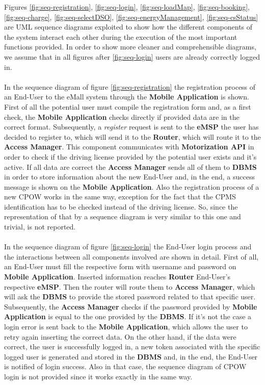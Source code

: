 \documentclass[a4paper]{report}
\begin{document}
Figures \ref{fig:seq-registration}, \ref{fig:seq-login}, \ref{fig:seq-loadMap}, \ref{fig:seq-booking}, \ref{fig:seq-charge}, \ref{fig:seq-selectDSO}, \ref{fig:seq-energyManagement}, \ref{fig:seq-csStatus} are UML sequence diagrams exploited to show how the different components of the system interact each other during the execution of the most important functions provided. In order to show more cleaner and comprehensible diagrams, we assume that in all figures after \ref{fig:seq-login} users are already correctly logged in.
\\\\
In the sequence diagram of figure \ref{fig:seq-registration} the registration process of an End-User to the eMall system through the \textbf{Mobile Application} is shown. First of all the potential user must compile the registration form and, as a first check, the \textbf{Mobile Application} checks directly if provided data are in the correct format. Subsequently, a \textit{register} request is sent to the \textbf{eMSP} the user has decided to register to, which will send it to the \textbf{Router}, which will route it to the \textbf{Access Manager}. This component communicates with \textbf{Motorization API} in order to check if the driving license provided by the potential user exists and it's active. If all data are correct the \textbf{Access Manager} sends all of them to \textbf{DBMS} in order to store information about the new End-User and, in the end, a success message is shown on the \textbf{Mobile Application}. Also the registration process of a new CPOW works in the same way, exception for the fact that the CPMS identification has to be checked instead of the driving license. So, since the representation of that by a sequence diagram is very similar to this one and trivial, is not reported.
\\\\
In the sequence diagram of figure \ref{fig:seq-login} the End-User login process and the interactions between all components involved are shown in detail. First of all, an End-User must fill the respective form with username and password on \textbf{Mobile Application}. Inserted information reaches \textbf{Router} End-User's respective \textbf{eMSP}. Then the router will route them to \textbf{Access Manager}, which will ask the \textbf{DBMS} to provide the stored password related to that specific user. Subsequently, the \textbf{Access Manager} checks if the password provided by \textbf{Mobile Application} is equal to the one provided by the \textbf{DBMS}. If it's not the case a login error is sent back to the \textbf{Mobile Application}, which allows the user to retry again inserting the correct data. On the other hand, if the data were correct, the user is successfully logged in, a new token associated with the specific logged user is generated and stored in the \textbf{DBMS} and, in the end, the End-User is notified of login success. Also in that case, the sequence diagram of CPOW login is not provided since it works exactly in the same way.
\end{document}
